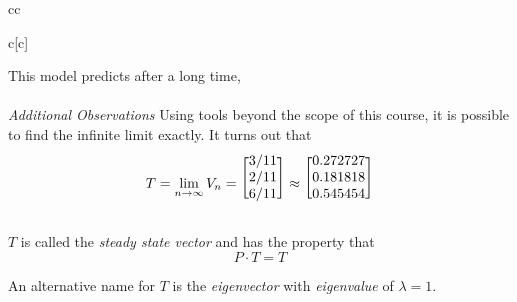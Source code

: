 \documentclass[11pt]{article}
\begin{document}
{{{{\begin{blockarray}{cc}
\begin{block}{c[c]}
 \end{block}
 \end{blockarray}
 }
This model predicts after a long time,
~\\\\
{\em Additional Observations} Using tools beyond the scope of this course, it is possible to find the infinite limit exactly.  It turns out that 
\large{	
$$T=\limn V_{n}=
 \begin{blockarray}{c}
 \begin{block}{[c]}
3/11 \\
 2/11 \\
 6/11\\
 \end{block}
 \end{blockarray}
 \approx 
  \begin{blockarray}{c}
  \begin{block}{[c]}
0.272727 \\
 0.181818 \\
 0.545454\\
 \end{block}
 \end{blockarray}
$$
}

$T$ is called the {\em steady state vector} and  has the property that $$P\cdot T=T$$

An alternative name for $T$ is the {\em eigenvector} with {\em eigenvalue} of $\lambda = 1$.
}
}

}
\end{document}
